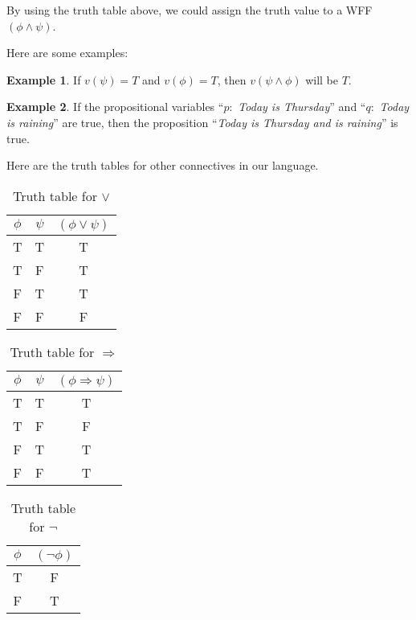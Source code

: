 \documentclass[11pt]{article}
\theoremstyle{definition}
\newtheorem{eg}{Example}[subsection]
\begin{document}
By using the truth table above, we could assign the truth value to a WFF $(\phi \wedge \psi)$.

Here are some examples:

\begin{eg}
    If $v(\psi)=T$ and $v(\phi)=T$, then $v(\psi \wedge \phi)$ will be $T$.
\end{eg}

\begin{eg}
    If the propositional variables ``$p:$ \textit{Today is Thursday}'' and ``$q:$ \textit{Today is raining}'' are true, then the proposition ``\textit{Today is Thursday and is raining}'' is true.
\end{eg}

Here are the truth tables for other connectives in our language.
\begin{table}[H]
    \centering
    \begin{tabular}{|c|c|c|}
    \hline
    \textbf{$\phi$} & \textbf{$\psi$} & \textbf{$(\phi \vee \psi)$} \\ \hline
    T          & T          & T          \\ \hline
    T          & F          & T          \\ \hline
    F          & T          & T          \\ \hline
    F          & F          & F          \\ \hline
    \end{tabular}
    \caption[]{Truth table for $\vee$}
\end{table}

\begin{table}[H]
    \centering
    \begin{tabular}{|c|c|c|}
    \hline
    \textbf{$\phi$} & \textbf{$\psi$} & \textbf{$(\phi \Rightarrow \psi)$} \\ \hline
    T          & T          & T          \\ \hline
    T          & F          & F          \\ \hline
    F          & T          & T          \\ \hline
    F          & F          & T          \\ \hline
    \end{tabular}
    \caption[]{Truth table for $\Rightarrow$}
\end{table}

\begin{table}[H]
    \centering
    \begin{tabular}{|c|c|}
    \hline
    \textbf{$\phi$} & \textbf{$(\neg \phi)$} \\ \hline
    T          & F          \\ \hline
    F          & T          \\ \hline
    \end{tabular}
    \caption[]{Truth table for $\neg$}
\end{table}
\end{document}
